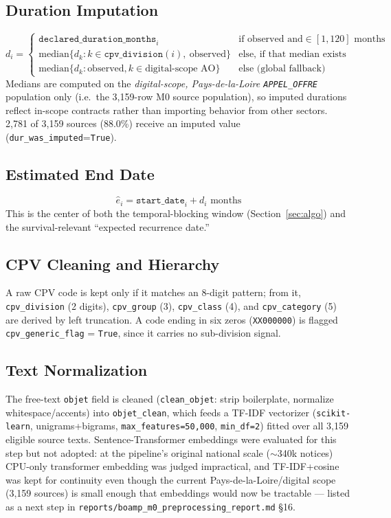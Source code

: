 \documentclass[11pt]{article}
\begin{document}
\subsection{Duration Imputation}
\begin{equation}
d_i =
\begin{cases}
\texttt{declared\_duration\_months}_i & \text{if observed and} \in [1,120]\text{ months} \\
\mathrm{median}\{d_k : k \in \texttt{cpv\_division}(i),\ \text{observed}\} & \text{else, if that median exists} \\
\mathrm{median}\{d_k : \text{observed}, k \in \text{digital-scope AO}\} & \text{else (global fallback)}
\end{cases}
\end{equation}
Medians are computed on the \emph{digital-scope, Pays-de-la-Loire
\texttt{APPEL\_OFFRE}} population only (i.e.\ the 3{,}159-row M0 source
population), so imputed durations reflect in-scope contracts rather than
importing behavior from other sectors. 2{,}781 of 3{,}159 sources (88.0\%)
receive an imputed value (\texttt{dur\_was\_imputed}=\texttt{True}).

\subsection{Estimated End Date}
\begin{equation}
\hat e_i = \texttt{start\_date}_i + d_i \text{ months}
\end{equation}
This is the center of both the temporal-blocking window
(Section~\ref{sec:algo}) and the survival-relevant ``expected recurrence
date.''

\subsection{CPV Cleaning and Hierarchy}
A raw CPV code is kept only if it matches an 8-digit pattern; from it,
\texttt{cpv\_division} (2 digits), \texttt{cpv\_group} (3), \texttt{cpv\_class}
(4), and \texttt{cpv\_category} (5) are derived by left truncation. A code
ending in six zeros (\texttt{XX000000}) is flagged \texttt{cpv\_generic\_flag}
= \texttt{True}, since it carries no sub-division signal.

\subsection{Text Normalization}
The free-text \texttt{objet} field is cleaned (\texttt{clean\_objet}: strip
boilerplate, normalize whitespace/accents) into \texttt{objet\_clean}, which
feeds a TF-IDF vectorizer (\texttt{scikit-learn}, unigrams+bigrams,
\texttt{max\_features=50{,}000}, \texttt{min\_df=2}) fitted over all 3{,}159
eligible source texts. Sentence-Transformer embeddings were evaluated for
this step but not adopted: at the pipeline's original national scale
($\sim$340k notices) CPU-only transformer embedding was judged impractical,
and TF-IDF+cosine was kept for continuity even though the current
Pays-de-la-Loire/digital scope (3{,}159 sources) is small enough that
embeddings would now be tractable --- listed as a next step in
\texttt{reports/boamp\_m0\_preprocessing\_report.md} \S16.
\end{document}
